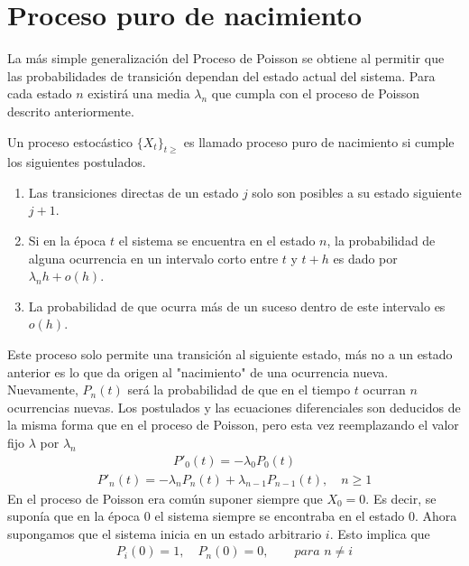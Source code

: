 \section{Proceso puro de nacimiento}
\label{proc_nac}
La más simple generalización del Proceso de Poisson se obtiene al permitir que las probabilidades de transición dependan del estado actual del sistema. Para cada estado $n$ existirá una media $\lambda_n$ que cumpla con el proceso de Poisson descrito anteriormente.
\begin{Def}
Un proceso estocástico $\{X_t\}_{t\geq}$ es llamado proceso puro de nacimiento si cumple los siguientes postulados.
    \begin{enumerate}
        \item Las transiciones directas de un estado $j$ solo son posibles a su estado siguiente $j+1$.
        \item Si en la época $t$ el sistema se encuentra en el estado $n$, la probabilidad de alguna ocurrencia en un intervalo corto entre $t$ y $t+h$ es dado por $\lambda_n h+o(h)$. 
        \item La probabilidad de que ocurra más de un suceso dentro de este intervalo es $o(h)$.
    \end{enumerate}
\end{Def}
Este proceso solo permite una transición al siguiente estado, más no a un estado anterior es lo que da origen al "nacimiento" de una ocurrencia nueva.\\Nuevamente, $P_n(t)$ será la probabilidad de que en el tiempo $t$ ocurran $n$ ocurrencias nuevas.
Los postulados y las ecuaciones diferenciales son deducidos de la misma forma que en el proceso de Poisson, pero esta vez reemplazando el valor fijo $\lambda$ por $\lambda_n$
\begin{eqnarray}
    P'_0(t)=-\lambda_0 P_0(t)
    \label{procNacimiento-edo-0}
\end{eqnarray}
\begin{eqnarray}
    P'_n(t)=-\lambda_n P_n(t)+\lambda_{n-1} P_{n-1}(t),\quad n\geq 1
    \label{procNacimiento-edo-n}
\end{eqnarray}
En el proceso de Poisson era común suponer siempre que $X_0=0$. Es decir, se suponía que en la época $0$ el sistema siempre se encontraba en el estado $0$.
Ahora supongamos que el sistema inicia en un estado arbitrario $i$. Esto implica que
\begin{eqnarray}
    P_i(0)=1,\quad P_n(0)=0,\quad\quad\textit{para }n\not=i
    \label{procNacimiento-edo-condInicial}
\end{eqnarray}

